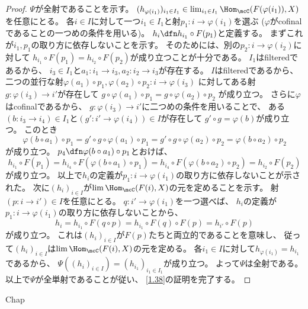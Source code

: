 \documentclass[uplatex,dvipdfmx]{jsarticle}
\begin{document}
\begin{proof}
  \(\Psi\)が全射であることを示す。
  \((h_{\varphi(i_1)})_{i_1\in I_1}\in \lim_{i_1\in I_1}\Hom_{\mcC}(F(\varphi(i_1)),X)\)
  を任意にとる。
  各\(i\in I\)に対して一つ\(i_1\in I_1\)と射\(p_1:i\to \varphi(i_1)\)を選ぶ
  (\(\varphi\)がcofinalであることの一つめの条件を用いる)。
  \(h_i \dfn h_{i_1}\circ F(p_1)\)と定義する。
  まずこれが\(i_1,p_1\)の取り方に依存しないことを示す。
  そのためには、別の\(p_2:i\to \varphi(i_2)\)に対して
  \(h_{i_1}\circ F(p_1) = h_{i_2}\circ F(p_2)\)が成り立つことが十分である。
  \(I_1\)はfilteredであるから、
  \(i_3\in I_1\)と\(a_1:i_1\to i_3,a_2:i_2\to i_3\)が存在する。
  \(I\)はfilteredであるから、
  二つの並行な射\(\varphi(a_1)\circ p_1, \varphi(a_2)\circ p_2: i \to \varphi(i_3)\)
  に対してある射\(g:\varphi(i_3)\to i'\)が存在して
  \(g\circ \varphi(a_1)\circ p_1 = g\circ \varphi(a_2)\circ p_2\)
  が成り立つ。
  さらに\(\varphi\)はcofinalであるから、
  \(g:\varphi(i_3)\to i'\)に二つめの条件を用いることで、
  ある\((b:i_3\to i_4)\in I_1\)と\((g':i'\to \varphi(i_4))\in I\)が存在して
  \(g' \circ g = \varphi(b)\)が成り立つ。
  このとき
  \[
  \varphi(b\circ a_1) \circ p_1
  = g'\circ g \circ \varphi(a_1) \circ p_1
  = g'\circ g \circ \varphi(a_2) \circ p_2
  = \varphi(b\circ a_2) \circ p_2
  \]
  が成り立つ。
  \(p_4 \dfn \varphi(b\circ a_1) \circ p_1\)とおけば、
  \[
  h_{i_1}\circ F(p_1)
  = h_{i_4} \circ F(\varphi(b\circ a_1)\circ p_1)
  = h_{i_4} \circ F(\varphi(b\circ a_2)\circ p_2)
  = h_{i_2}\circ F(p_2)
  \]
  が成り立つ。
  以上で\(h_i\)の定義が\(p_1:i\to \varphi(i_1)\)の取り方に依存しないことが示された。
  次に\((h_i)_{i\in I}\)が\(\lim\Hom_{\mcC}(F(i),X)\)の元を定めることを示す。
  射\((p:i\to i')\in I\)を任意にとる。
  \(q:i'\to \varphi(i_1)\)を一つ選べば、
  \(h_i\)の定義が\(p_1:i\to \varphi(i_1)\)の取り方に依存しないことから、
  \[
  h_i = h_{i_1}\circ F(q\circ p)
  = h_{i_1}\circ F(q) \circ F(p)
  = h_{i'} \circ F(p)
  \]
  が成り立つ。
  これは\((h_i)_{i\in I}\)が\(F(p)\)たちと両立的であることを意味し、
  従って\((h_i)_{i\in I}\)は\(\lim\Hom_{\mcC}(F(i),X)\)の元を定める。
  各\(i_1\in I\)に対して\(h_{\varphi(i_1)} = h_{i_1}\)であるから、
  \(\Psi((h_i)_{i\in I}) = (h_{i_1})_{i_1\in I_1}\)が成り立つ。
  よって\(\Psi\)は全射である。
  以上で\(\Psi\)が全単射であることが従い、
  \autoref{1.38}の証明を完了する。
\end{proof}





\ifcsname Chap\endcsname\else
\printbibliography
\end{document}
